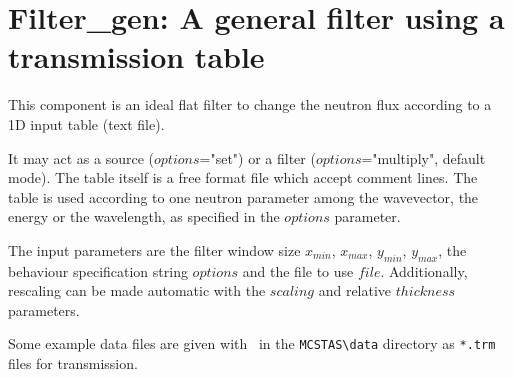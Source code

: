 \section{Filter\_gen: A general filter using a transmission table}
\label{filter-gen}


This component is an ideal flat filter to change the neutron flux according to a 1D input table (text file).

It may act as a source ($options$="set") or a filter ($options$="multiply", default mode). The table itself is a free format file which accept comment lines. The table is used according to one neutron parameter among the wavevector, the energy or the wavelength, as specified in the $options$ parameter.

The input parameters are the filter window size $x_{min}$, $x_{max}$, $y_{min}$, $y_{max}$, the behaviour specification string $options$ and the file to use $file$. Additionally, rescaling can be made automatic with the $scaling$ and relative $thickness$ parameters.

Some example data files are given with \MCS\ in the \verb+MCSTAS\data+ directory as \verb+*.trm+ files for transmission.